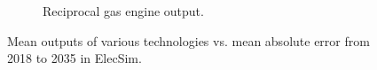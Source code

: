 \documentclass[final,3p,times,twocolumn,numbers]{elsarticle}
\begin{document}
\begin{figure}[h!]
\begin{subfigure}[b]{0.3\textwidth}
\caption{Reciprocal gas engine output.}
\label{fig:contributed_Recip_gas_mean_output}
\end{subfigure}
\label{fig:pv_coal_nuclear_offshore_outputs}
\caption{Mean outputs of various technologies vs. mean absolute error from 2018 to 2035 in ElecSim.}
\end{figure}
    
    

    
%
%
%
%
%
%



\end{document}
